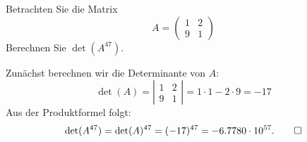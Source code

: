 Betrachten Sie die Matrix
\[
A=\begin{pmatrix}
1&2\\
9&1
\end{pmatrix}
\]
Berechnen Sie $\det(A^{47})$.


\begin{loesung}
Zunächst berechnen wir die Determinante von $A$:
\[
\det(A)=
\left|
\begin{matrix}
1&2\\
9&1
\end{matrix}
\right|
=1\cdot 1 - 2 \cdot 9 = -17
\]
Aus der Produktformel folgt:
\[
\det(A^{47})
=
\det(A)^{47}
=
(-17)^{47}
=
-6.7780\cdot 10^{57}.
\qedhere
\]
\end{loesung}




